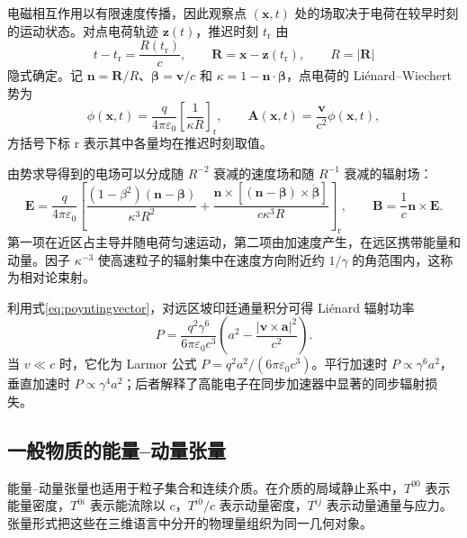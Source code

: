 \documentclass[style=classic,color=full]{lc-article}
\begin{document}
电磁相互作用以有限速度传播，因此观察点 $(\bm x,t)$ 处的场取决于电荷在较早时刻的运动状态。对点电荷轨迹 $\bm z(t)$，推迟时刻 $t_{\mathrm r}$ 由
\begin{equation}
  t-t_{\mathrm r}
  =\frac{R(t_{\mathrm r})}{c},
  \qquad
  \bm R=\bm x-\bm z(t_{\mathrm r}),
  \qquad R=\lvert\bm R\rvert
  \label{eq:retardedtime}
\end{equation}
隐式确定。记 $\bm n=\bm R/R$、$\bm\beta=\bm v/c$ 和 $\kappa=1-\bm n\mathbin{\cdot}\bm\beta$，点电荷的 Li\'enard--Wiechert 势为
\begin{equation}
  \phi(\bm x,t)
  =\frac{q}{4\pi\varepsilon_0}
  \left[\frac{1}{\kappa R}\right]_{\mathrm r},
  \qquad
  \bm A(\bm x,t)
  =\frac{\bm v}{c^2}\phi(\bm x,t),
  \label{eq:lienardwiechertpotentials}
\end{equation}
方括号下标 $\mathrm r$ 表示其中各量均在推迟时刻取值。

由势求导得到的电场可以分成随 $R^{-2}$ 衰减的速度场和随 $R^{-1}$ 衰减的辐射场：
\begin{equation}
  \bm E
  =\frac{q}{4\pi\varepsilon_0}
  \left[
    \frac{(1-\beta^2)(\bm n-\bm\beta)}
         {\kappa^3R^2}
    +\frac{\bm n\times
      \left[(\bm n-\bm\beta)\times\dot{\bm\beta}\right]}
      {c\kappa^3R}
  \right]_{\mathrm r},
  \qquad
  \bm B=\frac{1}{c}\bm n\times\bm E.
  \label{eq:lienardwiechertfields}
\end{equation}
第一项在近区占主导并随电荷匀速运动，第二项由加速度产生，在远区携带能量和动量。因子 $\kappa^{-3}$ 使高速粒子的辐射集中在速度方向附近约 $1/\gamma$ 的角范围内，这称为相对论束射。

利用式\eqref{eq:poyntingvector}，对远区坡印廷通量积分可得 Li\'enard 辐射功率
\begin{equation}
  \boxed{
  P
  =\frac{q^2\gamma^6}{6\pi\varepsilon_0c^3}
  \left(
    a^2-\frac{\lvert\bm v\times\bm a\rvert^2}{c^2}
  \right).}
  \label{eq:lienardpower}
\end{equation}
当 $v\ll c$ 时，它化为 Larmor 公式 $P=q^2a^2/(6\pi\varepsilon_0c^3)$。平行加速时 $P\propto\gamma^6a^2$，垂直加速时 $P\propto\gamma^4a^2$；后者解释了高能电子在同步加速器中显著的同步辐射损失\cite{jackson,griffiths}。

\subsection{一般物质的能量--动量张量}

能量--动量张量也适用于粒子集合和连续介质。在介质的局域静止系中，$T^{00}$ 表示能量密度，$T^{0i}$ 表示能流除以 $c$，$T^{i0}/c$ 表示动量密度，$T^{ij}$ 表示动量通量与应力。张量形式把这些在三维语言中分开的物理量组织为同一几何对象。
\end{document}
